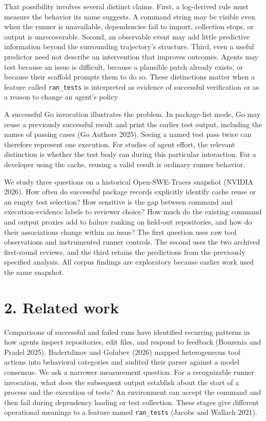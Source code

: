 \documentclass[10pt,a4paper]{article}
\begin{document}
That possibility involves several distinct claims. First, a log-derived rule must measure the behavior its name suggests. A command string may be visible even when the runner is unavailable, dependencies fail to import, collection stops, or output is unrecoverable. Second, an observable event may add little predictive information beyond the surrounding trajectory's structure. Third, even a useful predictor need not describe an intervention that improves outcomes. Agents may test because an issue is difficult, because a plausible patch already exists, or because their scaffold prompts them to do so. These distinctions matter when a feature called \texttt{ran\_tests} is interpreted as evidence of successful verification or as a reason to change an agent's policy.

A successful Go invocation illustrates the problem. In package-list mode, Go may reuse a previously successful result and print the earlier test output, including the names of passing cases (Go Authors 2025). Seeing a named test pass twice can therefore represent one execution. For studies of agent effort, the relevant distinction is whether the test body ran during this particular interaction. For a developer using the cache, reusing a valid result is ordinary runner behavior.

We study three questions on a historical Open-SWE-Traces snapshot (NVIDIA 2026). How often do successful package records explicitly identify cache reuse or an empty test selection? How sensitive is the gap between command and execution-evidence labels to reviewer choice? How much do the existing command and output proxies add to failure ranking on held-out repositories, and how do their associations change within an issue? The first question uses raw tool observations and instrumented runner controls. The second uses the two archived first-round reviews, and the third retains the predictions from the previously specified analysis. All corpus findings are exploratory because earlier work used the same snapshot.

\section{2. Related work}
Comparisons of successful and failed runs have identified recurring patterns in how agents inspect repositories, edit files, and respond to feedback (Bouzenia and Pradel 2025). Badertdinov and Golubev (2026) mapped heterogeneous tool actions into behavioral categories and audited their parser against a model consensus. We ask a narrower measurement question. For a recognizable runner invocation, what does the subsequent output establish about the start of a process and the execution of tests? An environment can accept the command and then fail during dependency loading or test collection. These stages give different operational meanings to a feature named \texttt{ran\_tests} (Jacobs and Wallach 2021).
\end{document}
